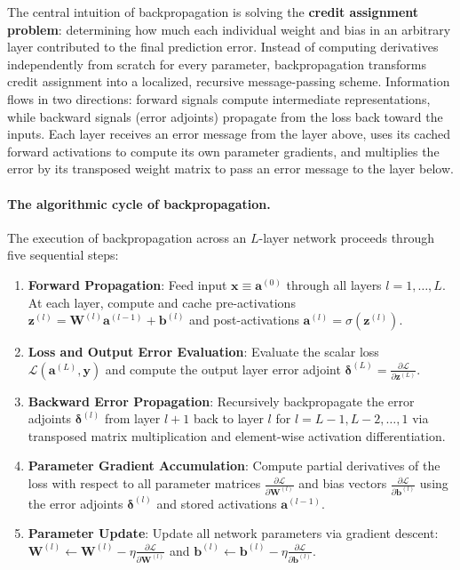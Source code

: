 The central intuition of backpropagation is solving the \textbf{credit assignment problem}: determining how much each individual weight and bias in an arbitrary layer contributed to the final prediction error. Instead of computing derivatives independently from scratch for every parameter, backpropagation transforms credit assignment into a localized, recursive message-passing scheme. Information flows in two directions: forward signals compute intermediate representations, while backward signals (error adjoints) propagate from the loss back toward the inputs. Each layer receives an error message from the layer above, uses its cached forward activations to compute its own parameter gradients, and multiplies the error by its transposed weight matrix to pass an error message to the layer below.

\paragraph{The algorithmic cycle of backpropagation.}
The execution of backpropagation across an $L$-layer network proceeds through five sequential steps:
\begin{enumerate}[noitemsep,topsep=2pt,parsep=0pt,partopsep=0pt]
  \item \textbf{Forward Propagation}: Feed input $\mathbf{x} \equiv \mathbf{a}^{(0)}$ through all layers $l = 1, \dots, L$. At each layer, compute and cache pre-activations $\mathbf{z}^{(l)} = \mathbf{W}^{(l)} \mathbf{a}^{(l-1)} + \mathbf{b}^{(l)}$ and post-activations $\mathbf{a}^{(l)} = \sigma(\mathbf{z}^{(l)})$.
  \item \textbf{Loss and Output Error Evaluation}: Evaluate the scalar loss $\mathcal{L}(\mathbf{a}^{(L)}, \mathbf{y})$ and compute the output layer error adjoint $\boldsymbol{\delta}^{(L)} = \frac{\partial \mathcal{L}}{\partial \mathbf{z}^{(L)}}$.
  \item \textbf{Backward Error Propagation}: Recursively backpropagate the error adjoints $\boldsymbol{\delta}^{(l)}$ from layer $l+1$ back to layer $l$ for $l = L-1, L-2, \dots, 1$ via transposed matrix multiplication and element-wise activation differentiation.
  \item \textbf{Parameter Gradient Accumulation}: Compute partial derivatives of the loss with respect to all parameter matrices $\frac{\partial \mathcal{L}}{\partial \mathbf{W}^{(l)}}$ and bias vectors $\frac{\partial \mathcal{L}}{\partial \mathbf{b}^{(l)}}$ using the error adjoints $\boldsymbol{\delta}^{(l)}$ and stored activations $\mathbf{a}^{(l-1)}$.
  \item \textbf{Parameter Update}: Update all network parameters via gradient descent: $\mathbf{W}^{(l)} \leftarrow \mathbf{W}^{(l)} - \eta \frac{\partial \mathcal{L}}{\partial \mathbf{W}^{(l)}}$ and $\mathbf{b}^{(l)} \leftarrow \mathbf{b}^{(l)} - \eta \frac{\partial \mathcal{L}}{\partial \mathbf{b}^{(l)}}$.
\end{enumerate}

